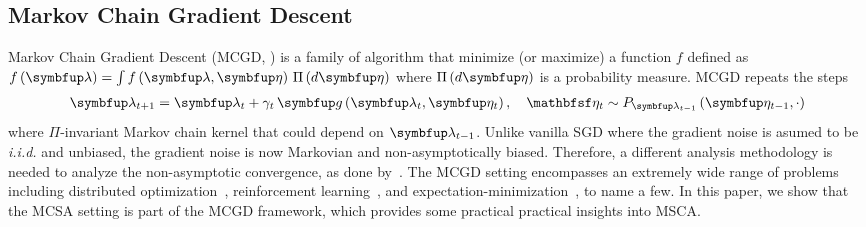 \subsection{Markov Chain Gradient Descent}\label{section:mcgd}
Markov Chain Gradient Descent (MCGD, \citealt{duchi_ergodic_2012, NEURIPS2018_1371bcce}) is a family of algorithm that minimize (or maximize) a function \(f\) defined as \(f\left(\vlambda\right) = \int f\left(\vlambda, \veta\right) \, \Pi\left(d\veta\right)\) where \(\Pi\left(d\veta\right)\) is a probability measure.
MCGD repeats the steps 
{%
\begin{align}
  \vlambda_{t+1}    = \vlambda_{t} + \gamma_t \, \vg\left(\vlambda_t, \veta_{t}\right),\quad 
  \rvveta_{t}  \sim P_{\vlambda_{t-1}}\left( \veta_{t-1}, \cdot \right)\label{eq:mcgd}
\end{align}
}%
where \(\Pi\)-invariant Markov chain kernel that could depend on \(\vlambda_{t-1}\).
Unlike vanilla SGD where the gradient noise is asumed to be \textit{i.i.d.} and unbiased, the gradient noise is now Markovian and non-asymptotically biased.
Therefore, a different analysis methodology is needed to analyze the non-asymptotic convergence, as done by~\citet{duchi_ergodic_2012, pmlr-v99-karimi19a, doan_convergence_2020, Xiong_Xu_Liang_Zhang_2021}.
The MCGD setting encompasses an extremely wide range of problems including distributed optimization~\citep{ram_incremental_2009}, reinforcement learning~\citep{tadic_asymptotic_2017, doan_convergence_2020, Xiong_Xu_Liang_Zhang_2021}, and expectation-minimization~\citep{pmlr-v99-karimi19a}, to name a few.
In this paper, we show that the MCSA setting is part of the MCGD framework, which provides some practical practical insights into MSCA.

